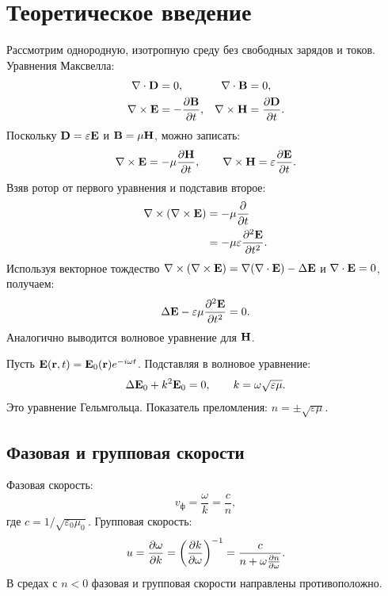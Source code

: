 \documentclass[a4paper,12pt]{article}
\begin{document}
\section{Теоретическое введение}
Рассмотрим однородную, изотропную среду без свободных зарядов и токов. Уравнения Максвелла:
\begin{align}
    \nabla \cdot \vb{D} &= 0, & \nabla \cdot \vb{B} &= 0, \\
    \nabla \times \vb{E} &= -\pdv{\vb{B}}{t}, & \nabla \times \vb{H} &= \pdv{\vb{D}}{t}.
\end{align}
Поскольку $\vb{D} = \varepsilon \vb{E}$ и $\vb{B} = \mu \vb{H}$, можно записать:
\begin{equation}
    \nabla \times \vb{E} = -\mu \pdv{\vb{H}}{t}, \qquad
    \nabla \times \vb{H} = \varepsilon \pdv{\vb{E}}{t}.
\end{equation}
Взяв ротор от первого уравнения и подставив второе:
\begin{align*}
    \nabla \times (\nabla \times \vb{E}) &= -\mu \pdv{}{t}(\nabla \times \vb{H}) \\
    &= -\mu \varepsilon \pdv[2]{\vb{E}}{t}.
\end{align*}
Используя векторное тождество $\nabla \times (\nabla \times \vb{E}) = \nabla(\nabla \cdot \vb{E}) - \Delta \vb{E}$ и $\nabla \cdot \vb{E} = 0$, получаем:
\begin{equation}
    \Delta \vb{E} - \varepsilon\mu \pdv[2]{\vb{E}}{t} = 0.
\end{equation}
Аналогично выводится волновое уравнение для $\vb{H}$.


Пусть $\vb{E}(\vb{r},t) = \vb{E}_0(\vb{r})e^{-i\omega t}$. Подставляя в волновое уравнение:
\begin{equation}
    \Delta \vb{E}_0 + k^2 \vb{E}_0 = 0, \qquad k = \omega \sqrt{\varepsilon\mu}.
\end{equation}
Это уравнение Гельмгольца. Показатель преломления: $n = \pm\sqrt{\varepsilon \mu}$.

\subsection{Фазовая и групповая скорости}
Фазовая скорость:
\begin{equation}
    v_{\text{ф}} = \frac{\omega}{k} = \frac{c}{n},
\end{equation}
где $c = 1/\sqrt{\varepsilon_0 \mu_0}$. Групповая скорость:
\begin{equation}
    u = \pdv{\omega}{k} = \left(\pdv{k}{\omega}\right)^{-1} = \frac{c}{n + \omega \pdv{n}{\omega}}.
\end{equation}
В средах с $n<0$ фазовая и групповая скорости направлены противоположно.
\end{document}
